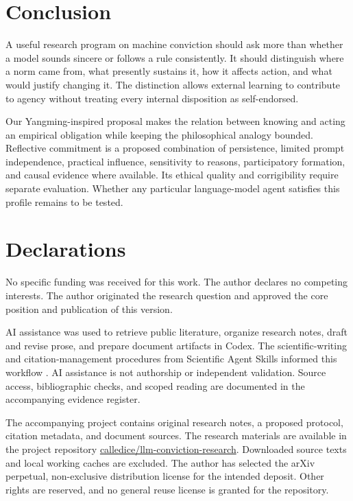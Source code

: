 \documentclass[11pt]{article}
\begin{document}
\section{Conclusion}

A useful research program on machine conviction should ask more than whether a model sounds sincere or follows a rule consistently. It should distinguish where a norm came from, what presently sustains it, how it affects action, and what would justify changing it. The distinction allows external learning to contribute to agency without treating every internal disposition as self-endorsed.

Our Yangming-inspired proposal makes the relation between knowing and acting an empirical obligation while keeping the philosophical analogy bounded. Reflective commitment is a proposed combination of persistence, limited prompt independence, practical influence, sensitivity to reasons, participatory formation, and causal evidence where available. Its ethical quality and corrigibility require separate evaluation. Whether any particular language-model agent satisfies this profile remains to be tested.

\section*{Declarations}

No specific funding was received for this work. The author declares no competing interests. The author originated the research question and approved the core position and publication of this version.

AI assistance was used to retrieve public literature, organize research notes, draft and revise prose, and prepare document artifacts in Codex. The scientific-writing and citation-management procedures from Scientific Agent Skills informed this workflow \cite{Skills2026}. AI assistance is not authorship or independent validation. Source access, bibliographic checks, and scoped reading are documented in the accompanying evidence register.

The accompanying project contains original research notes, a proposed protocol, citation metadata, and document sources. The research materials are available in the project repository \href{https://github.com/calledice/llm-conviction-research}{calledice/llm-conviction-research}. Downloaded source texts and local working caches are excluded. The author has selected the arXiv perpetual, non-exclusive distribution license for the intended deposit. Other rights are reserved, and no general reuse license is granted for the repository.
\end{document}
